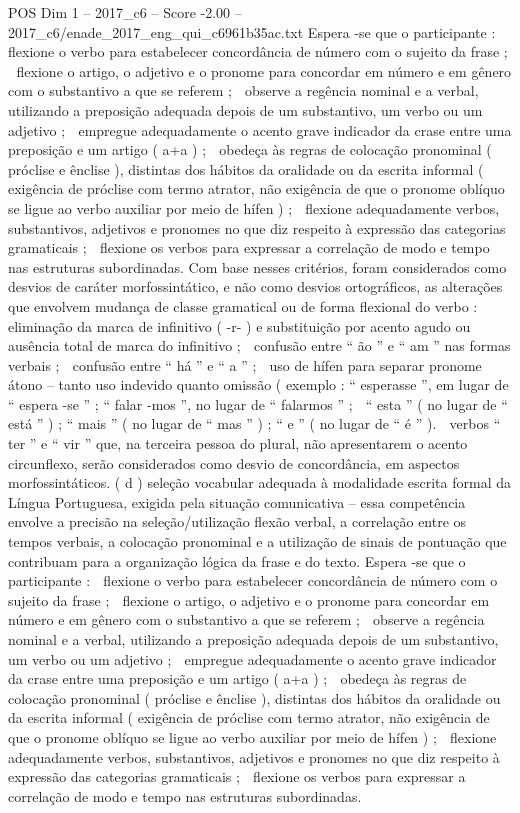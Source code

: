 \begin{textsample}{POS Dim 1 – 2017\_c6 – Score -2.00 – 2017\_c6/enade\_2017\_eng\_qui\_c6961b35ac.txt}
Espera -se que o participante :  flexione o verbo para estabelecer concordância de número com o sujeito da frase ;  flexione o artigo, o adjetivo e o pronome para concordar em número e em gênero com o substantivo a que se referem ;  observe a regência nominal e a verbal, utilizando a preposição adequada depois de um substantivo, um verbo ou um adjetivo ;  empregue adequadamente o acento grave indicador da crase entre uma preposição e um artigo ( a+a ) ;  obedeça às regras de colocação pronominal ( próclise e ênclise ), distintas dos hábitos da oralidade ou da escrita informal ( exigência de próclise com termo atrator, não exigência de que o pronome oblíquo se ligue ao verbo auxiliar por meio de hífen ) ;  flexione adequadamente verbos, substantivos, adjetivos e pronomes no que diz respeito à expressão das categorias gramaticais ;  flexione os verbos para expressar a correlação de modo e tempo nas estruturas subordinadas.
Com base nesses critérios, foram considerados como desvios de caráter morfossintático, e não como desvios ortográficos, as alterações que envolvem mudança de classe gramatical ou de forma flexional do verbo :  eliminação da marca de infinitivo ( -r- ) e substituição por acento agudo ou ausência total de marca do infinitivo ;  confusão entre “ ão ” e “ am ” nas formas verbais ;  confusão entre “ há ” e “ a ” ;  uso de hífen para separar pronome átono – tanto uso indevido quanto omissão ( exemplo : “ esperasse ”, em lugar de “ espera -se ” ; “ falar -mos ”, no lugar de “ falarmos ” ;  “ esta ” ( no lugar de “ está ” ) ; “ mais ” ( no lugar de “ mas ” ) ; “ e ” ( no lugar de “ é ” ).  verbos “ ter ” e “ vir ” que, na terceira pessoa do plural, não apresentarem o acento circunflexo, serão considerados como desvio de concordância, em aspectos morfossintáticos. ( d ) seleção vocabular adequada à modalidade escrita formal da Língua Portuguesa, exigida pela situação comunicativa – essa competência envolve a precisão na seleção/utilização flexão verbal, a correlação entre os tempos verbais, a colocação pronominal e a utilização de sinais de pontuação que contribuam para a organização lógica da frase e do texto.
Espera -se que o participante :  flexione o verbo para estabelecer concordância de número com o sujeito da frase ;  flexione o artigo, o adjetivo e o pronome para concordar em número e em gênero com o substantivo a que se referem ;  observe a regência nominal e a verbal, utilizando a preposição adequada depois de um substantivo, um verbo ou um adjetivo ;  empregue adequadamente o acento grave indicador da crase entre uma preposição e um artigo ( a+a ) ;  obedeça às regras de colocação pronominal ( próclise e ênclise ), distintas dos hábitos da oralidade ou da escrita informal ( exigência de próclise com termo atrator, não exigência de que o pronome oblíquo se ligue ao verbo auxiliar por meio de hífen ) ;  flexione adequadamente verbos, substantivos, adjetivos e pronomes no que diz respeito à expressão das categorias gramaticais ;  flexione os verbos para expressar a correlação de modo e tempo nas estruturas subordinadas.

\end{textsample}
